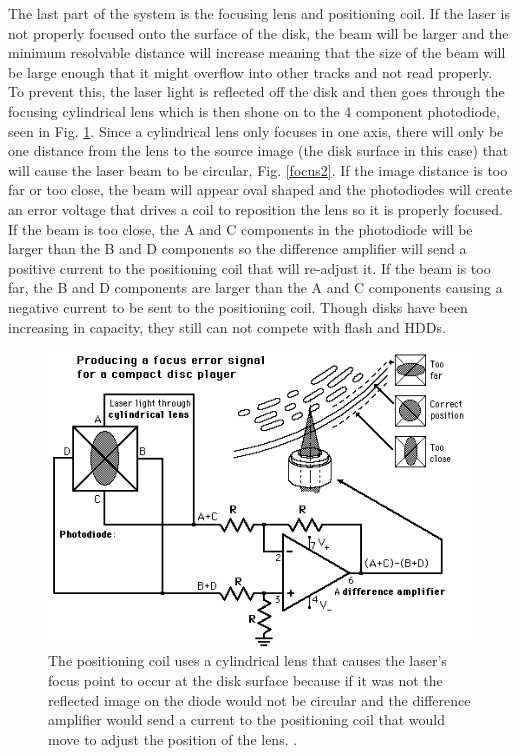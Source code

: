 \documentclass[ notitlepage, numerical, 11pt]{revtex4-1} %
\begin{document}
The last part of the system is the focusing lens and positioning coil. If the laser is not properly focused onto the surface of the disk, the beam will be larger and the minimum resolvable distance will increase meaning that the size of the beam will be large enough that it might overflow into other tracks and not read properly. To prevent this, the laser light is reflected off the disk and then goes through the focusing cylindrical lens which is then shone on to the 4 component photodiode, seen in Fig. \ref{focus}. Since a cylindrical lens only focuses in one axis, there will only be one distance from the lens to the source image (the disk surface in this case) that will cause the laser beam to be circular, Fig. \ref{focus2}. If the image distance is too far or too close, the beam will appear oval shaped and the photodiodes will create an error voltage that drives a coil to reposition the lens so it is properly focused. If the beam is too close, the A and C components in the photodiode will be larger than the B and D components so the difference amplifier will send a positive current to the positioning coil that will re-adjust it. If the beam is too far, the B and D components are larger than the A and C components causing a negative current to be sent to the positioning coil. Though disks have been increasing in capacity, they still can not compete with flash and HDDs.




\begin{figure}[H]
\centerline{\includegraphics[scale=.7]{focus.png}}
\caption{The positioning coil uses a cylindrical lens that causes the laser's focus point to occur at the disk surface because if it was not the reflected image on the diode would not be circular and the difference amplifier would send a current to the positioning coil that would move to adjust the position of the lens. \cite {hyper}.}
\label{focus}
\end{figure} 
\end{document}
